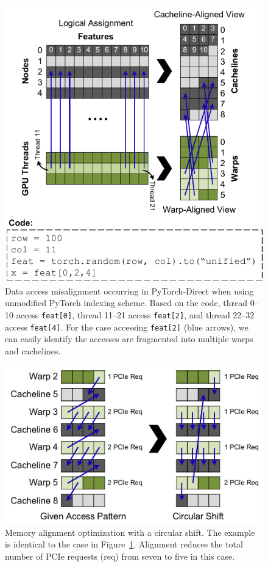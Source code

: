 \begin{figure}[]
    \centering
    \includegraphics[width=0.7\linewidth]{figures/PyDArXiv/alignment_problem.pdf}
    \caption{Data access misalignment occurring in PyTorch-Direct when using unmodified PyTorch indexing scheme. Based on the code, thread 0--10 access \texttt{feat[0]}, thread 11--21 access \texttt{feat[2]}, and thread 22--32 access \texttt{feat[4]}. For the case accessing \texttt{feat[2]} (blue arrows), we can easily identify the accesses are fragmented into multiple warps and cachelines.}
    \label{fig:alignment_problem}
\end{figure}

\begin{figure}[]
    \centering
    \includegraphics[width=0.7\linewidth]{figures/PyDArXiv/alignment_fix.pdf}
    \caption{Memory alignment optimization with a circular shift. The example is identical to the case in Figure~\ref{fig:alignment_problem}. Alignment reduces the total number of PCIe requests (req) from seven to five in this case.
    }
    \label{fig:alignment_fix}
\end{figure}
